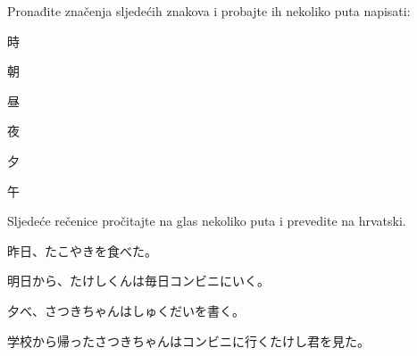 
\author{Ivan Petranović}

	
	\begin{mondai}{Pronađite značenja sljedećih znakova i probajte ih nekoliko puta napisati:}
		\item 時
		\item 朝
		\item 昼
		\item 夜
		\item 夕
		\item 午
	\end{mondai}

	\begin{mondai}{Sljedeće rečenice pročitajte na glas nekoliko puta i prevedite na hrvatski.}
		\item 昨日、たこやきを食べた。
		\item 明日から、たけしくんは毎日コンビニにいく。
		\item 夕べ、さつきちゃんはしゅくだいを書く。
		\item *学校から帰ったさつきちゃんはコンビニに行くたけし君を見た。
	\end{mondai}

